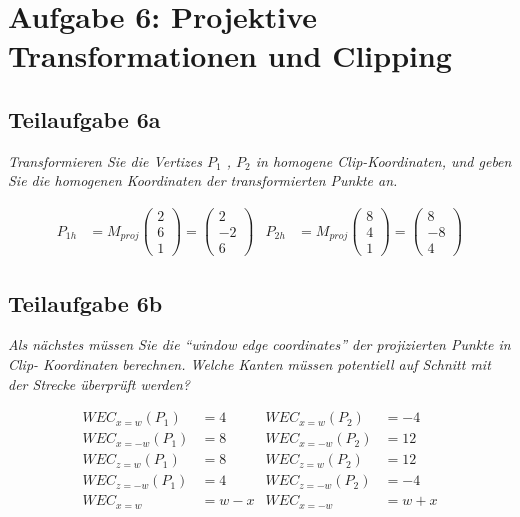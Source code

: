\documentclass[a4paper]{scrartcl}
\begin{document}
\section*{Aufgabe 6: Projektive Transformationen und Clipping}
\subsection*{Teilaufgabe 6a}
\textit{Transformieren Sie die Vertizes $P_1$ , $P_2$
in homogene Clip-Koordinaten, und geben Sie die homogenen Koordinaten der
transformierten Punkte an.}

\begin{align}
      P_{1h} &= M_{proj} \begin{pmatrix}2\\6\\1\end{pmatrix} = \begin{pmatrix}2\\-2\\6\end{pmatrix}
    & P_{2h} &= M_{proj} \begin{pmatrix}8\\4\\1\end{pmatrix} = \begin{pmatrix}8\\-8\\4\end{pmatrix}
\end{align}

\subsection*{Teilaufgabe 6b}
\textit{Als nächstes müssen Sie die \enquote{window edge coordinates} der
projizierten Punkte in Clip- Koordinaten berechnen. Welche Kanten müssen
potentiell auf Schnitt mit der Strecke überprüft werden?}

\begin{align}
    WEC_{x=w}(P_1)  &= 4     & WEC_{x=w}(P_2)  &= -4\\
    WEC_{x=-w}(P_1) &= 8     & WEC_{x=-w}(P_2) &= 12\\
    WEC_{z=w}(P_1)  &= 8     & WEC_{z=w}(P_2)  &= 12\\
    WEC_{z=-w}(P_1) &= 4     & WEC_{z=-w}(P_2) &= -4\\
    WEC_{x=w}       &= w - x & WEC_{x=-w}      &= w + x
\end{align}
\end{document}
